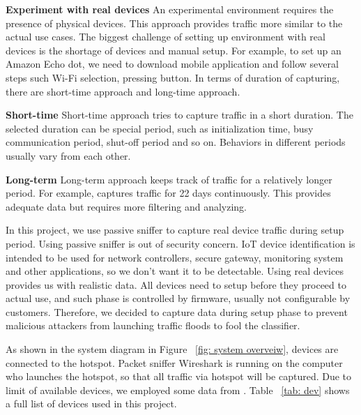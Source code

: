 \documentclass[twocolumn,10pt]{article}
\begin{document}
\textbf{Experiment with real devices}
An experimental environment requires the presence of physical devices. This approach provides traffic more similar to the actual use cases. The biggest challenge of setting up environment with real devices is the shortage of devices and manual setup. For example, to set up an Amazon Echo dot, we need to download mobile application and follow several steps such Wi-Fi selection, pressing button.
\newline
\newline
In terms of duration of capturing, there are short-time approach and long-time approach.

\textbf{Short-time}
Short-time approach tries to capture traffic in a short duration. The selected duration can be special period, such as initialization time, busy communication period, shut-off period and so on. Behaviors in different periods usually vary from each other.

\textbf{Long-term}
Long-term approach keeps track of traffic for a relatively longer period. For example, \cite{amar2018analysis} captures traffic for 22 days continuously. This provides adequate data but requires more filtering and analyzing.

In this project, we use passive sniffer to capture real device traffic during setup period. Using passive sniffer is out of security concern. IoT device identification is intended to be used for network controllers, secure gateway, monitoring system and other applications, so we don’t want it to be detectable. Using real devices provides us with realistic data. All devices need to setup before they proceed to actual use, and such phase is controlled by firmware, usually not configurable by customers. Therefore, we decided to capture data during setup phase to prevent malicious attackers from launching traffic floods to fool the classifier.

As shown in the system diagram in Figure ~\ref{fig: system overveiw}, devices are connected to the hotspot. Packet sniffer Wireshark is running on the computer who launches the hotspot, so that all traffic via hotspot will be captured. Due to limit of available devices, we employed some data from \cite{miettinen2017iot}. Table ~\ref{tab: dev} shows a full list of devices used in this project.
\end{document}
